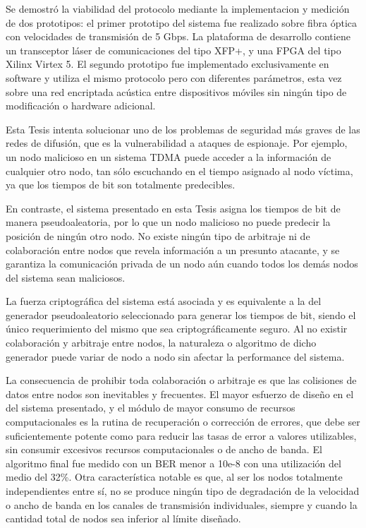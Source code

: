
Se demostró la viabilidad del protocolo mediante la implementacion y medición de dos prototipos: el primer prototipo del sistema fue realizado sobre fibra óptica con velocidades de transmisión de 5 Gbps. La plataforma de desarrollo contiene un transceptor láser de comunicaciones del tipo XFP+, y una FPGA del tipo Xilinx Virtex 5.
El segundo prototipo fue implementado exclusivamente en software y utiliza el mismo protocolo pero con diferentes parámetros, esta vez sobre una red encriptada acústica entre dispositivos móviles sin ningún tipo de modificación o hardware adicional.

Esta Tesis intenta solucionar uno de los problemas de seguridad más graves de las redes de difusión, que es la vulnerabilidad a ataques de espionaje. Por ejemplo, un nodo malicioso en un sistema TDMA puede acceder a la información de cualquier otro nodo, tan sólo escuchando en el tiempo asignado al nodo víctima, ya que los tiempos de bit son totalmente predecibles.  

En contraste, el sistema presentado en esta Tesis asigna los tiempos de bit de manera pseudoaleatoria, por lo que un nodo malicioso no puede predecir la posición de ningún otro nodo. No existe ningún tipo de arbitraje ni de colaboración entre nodos que revela información a un presunto atacante, y se garantiza la comunicación privada de un nodo aún cuando todos los demás nodos del sistema sean maliciosos.

La fuerza criptográfica del sistema está asociada y es equivalente a la del generador pseudoaleatorio seleccionado para generar los tiempos de bit, siendo el único requerimiento del mismo que sea criptográficamente seguro. Al no existir colaboración y arbitraje entre nodos, la naturaleza o algoritmo de dicho generador puede variar de nodo a nodo sin afectar la performance del sistema. 

La consecuencia de prohibir toda colaboración o arbitraje es que las colisiones de datos entre nodos son inevitables y frecuentes. El mayor esfuerzo de diseño en el del sistema presentado, y el módulo de mayor consumo de recursos computacionales es la rutina de recuperación o corrección de errores, que debe ser suficientemente potente como para reducir las tasas de error a valores utilizables, sin consumir excesivos recursos computacionales o de ancho de banda. El algoritmo final fue medido con un BER menor a 10e-8 con una utilización del medio del 32\%. Otra característica notable es que, al ser los nodos totalmente independientes entre sí, no se produce ningún tipo de degradación de la velocidad o ancho de banda en los canales de transmisión individuales, siempre y cuando la cantidad total de nodos sea inferior al límite diseñado.

